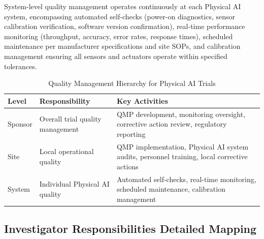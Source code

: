 System-level quality management operates continuously at each Physical AI
system, encompassing automated self-checks (power-on diagnostics, sensor
calibration verification, software version confirmation), real-time performance
monitoring (throughput, accuracy, error rates, response times), scheduled
maintenance per manufacturer specifications and site SOPs, and calibration
management ensuring all sensors and actuators operate within specified
tolerances.

\begin{table}[H]
\centering
\caption{Quality Management Hierarchy for Physical AI Trials}
\label{tab:ich-quality}
\small
\begin{tabularx}{\textwidth}{l X X}
\toprule
\textbf{Level} & \textbf{Responsibility} & \textbf{Key Activities} \\
\midrule
Sponsor & Overall trial quality management & QMP development, monitoring oversight, corrective action review, regulatory reporting \\
Site & Local operational quality & QMP implementation, Physical AI system audits, personnel training, local corrective actions \\
System & Individual Physical AI quality & Automated self-checks, real-time monitoring, scheduled maintenance, calibration management \\
\bottomrule
\end{tabularx}
\end{table}

\subsection{Investigator Responsibilities Detailed Mapping}
\label{subsec:ich-investigator-detail}

